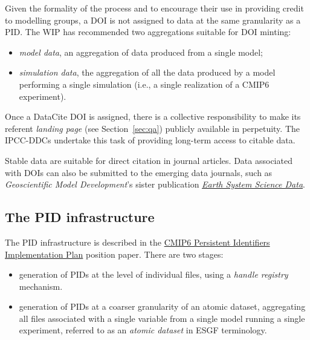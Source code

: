 \documentclass[gmd,manuscript]{copernicus}
\newcommand{\secref}[1] {\mbox{Section  \ref{sec:#1}}}
\begin{document}
\begin{itemize}
  Given the formality of the process and to encourage their use in
  providing credit to modelling groups, a DOI is not assigned to data at
  the same granularity as a PID. The WIP has recommended two
  aggregations suitable for DOI minting:

  \begin{itemize}
  \item \emph{model data}, an aggregation of data produced from a
    single model;
  \item \emph{simulation data}, the aggregation of all the data
    produced by a model performing a single simulation (i.e., a single
    realization of a CMIP6 experiment).
  \end{itemize}

  Once a DataCite DOI is assigned, there is a collective
  responsibility to make its referent \emph{landing page} (see
  \secref{qa}) publicly available in perpetuity. The IPCC-DDCs
  undertake this task of providing long-term access to citable data.

  Stable data are suitable for direct citation in journal articles.
  Data associated with DOIs can also be submitted to the emerging data
  journals, such as \emph{Geoscientific Model Development}'s sister
  publication
  \href{https://www.earth-system-science-data.net/}{\emph{Earth System
      Science Data}}.
\end{itemize}

\subsection{The PID infrastructure}
\label{sec:pid}

The PID infrastructure is described in the
\href{https://goo.gl/dQAEDy}{CMIP6 Persistent Identifiers
  Implementation Plan} position paper. There are two stages:

\begin{itemize}
\item generation of PIDs at the level of individual files, using a
  \emph{handle registry} mechanism.
\item generation of PIDs at a coarser granularity of an atomic
  dataset, aggregating all files associated with a single variable
  from a single model running a single experiment, referred to as an
  \emph{atomic dataset} in ESGF terminology.
\end{itemize}
\end{document}
